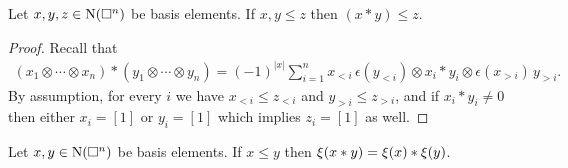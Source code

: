 \begin{lemma}
	Let $x, y, z \in \operatorname{N}(\square^n)$ be basis elements.
	If $x, y \leq z$ then $(x \ast y) \leq z$.
\end{lemma}

\begin{proof}
	Recall that
	\begin{align*}
	(x_1 \otimes \cdots \otimes x_n) \ast (y_1 \otimes \cdots \otimes y_n) =
	(-1)^{|x|} \sum_{i=1}^n x_{<i}\, \epsilon(y_{<i}) \otimes x_i \ast y_i \otimes \epsilon(x_{>i}) \, y_{>i}.
	\end{align*}
	By assumption, for every $i$ we have $x_{<i} \leq z_{<i}$ and $y_{>i} \leq z_{>i}$, and if $x_i \ast y_i \neq 0$ then either $x_i = [1]$ or $y_i = [1]$ which implies $z_i = [1]$ as well.
\end{proof}

\begin{lemma}
	Let $x, y \in \operatorname{N}(\square^n)$ be basis elements.
	If $x \leq y$ then $\operatorname{\xi}(x \ast y) = \operatorname{\xi}(x) \ast \operatorname{\xi}(y)$.
\end{lemma}

